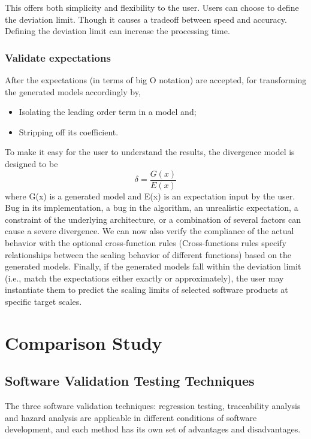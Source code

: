 \documentclass[journal, onecolumn]{IEEEtran}
\begin{document}
	
	This offers both simplicity and flexibility to the user. Users can choose to define the deviation limit. Though it causes a tradeoff between speed and accuracy. Defining the deviation limit can increase the processing time.
	\newline \newline
	\subsubsection{Validate expectations}
	
	After the expectations (in terms of big O notation) are accepted, for transforming the generated models accordingly by, 
	\begin{itemize}
		\item Isolating the leading order term in a model and;
		\item Stripping off its coefficient.
	\end{itemize}
	
	To make it easy for the user to understand the results, the divergence model is designed to be $$ \delta=\frac{G(x)}{E(x)}$$ where G(x) is a generated model and E(x) is an expectation input by the user. Bug in its implementation, a bug in the algorithm, an unrealistic expectation, a constraint of the underlying architecture, or a combination of several factors can cause a severe divergence.
	\newline \newline
	We can now also verify the compliance of the actual behavior with the optional cross-function rules (Cross-functions rules specify relationships between the scaling behavior of different functions) based on the generated models. Finally, if the generated models fall within the deviation limit (i.e., match the expectations either exactly or approximately), the user may instantiate them to predict the scaling limits of selected software products at specific target scales.
	\bigskip
	
	\section{Comparison Study}
	\bigskip	
	\subsection{Software Validation Testing Techniques}
	\bigskip
	The three software validation techniques: regression testing, traceability analysis and hazard analysis are applicable in different conditions of software development, and each method has its own set of advantages and disadvantages.
	
\end{document}
